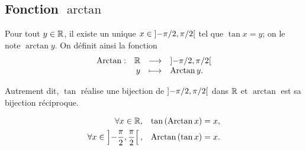 \documentclass{magnolia}
\begin{document}
\subsection{Fonction $\arctan$}

\begin{definition}[utile=-3]
Pour tout $y\in\mathbb{R}$, il existe un unique $x\in\left]-\pi/2,\pi/2\right[$
tel que $\tan x=y$; on le note $\arctan y$. On définit ainsi la fonction
\[\begin{array}[t]{lrcl} \displaystyle{\operatorname{Arctan}} : & \displaystyle{\mathbb{R}} & \longrightarrow & \displaystyle{\left]-\pi/2,\pi/2\right[} \\ & \displaystyle{y} & \longmapsto & \displaystyle{\operatorname{Arctan}y.} \end{array}\]
\end{definition}

\begin{remarqueUnique}
\remarque Autrement dit, $\tan$ réalise une bijection de $\left]-\pi/2,\pi/2\right[$ dans $\mathbb{R}$ et $\arctan$ est sa bijection réciproque.
\end{remarqueUnique}

\begin{proposition}[utile=-3]
\begin{eqnarray*}
\forall x\in\mathbb{R}, & & \tan\left(\operatorname{Arctan} x\right)=x,\\
\forall x\in\left]-\frac{\pi}{2},\frac{\pi}{2}\right[, & &
  \operatorname{Arctan}\left(\tan x\right)=x.  
\end{eqnarray*}
\end{proposition}
\end{document}
